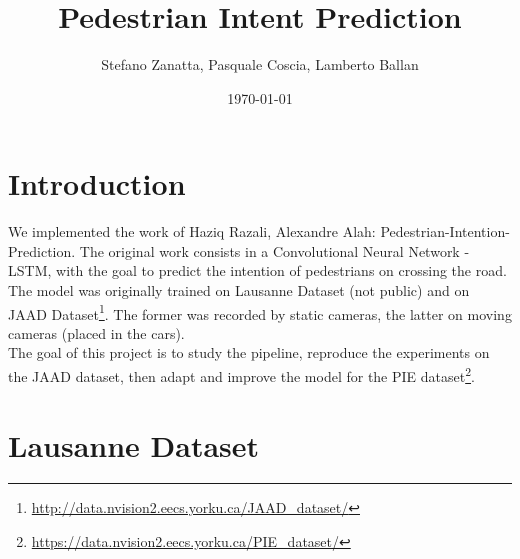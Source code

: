 \documentclass[11pt]{article}
\title{Pedestrian Intent Prediction}
\author{Stefano Zanatta, Pasquale Coscia, Lamberto Ballan}
\date{\today}
\begin{document}
\maketitle


\section{Introduction}
    We implemented the work of Haziq Razali, Alexandre Alah:
    Pedestrian-Intention-Prediction\cite{PedestrianIntentionPrediction}.
    The original work consists in a Convolutional Neural Network - LSTM, with the goal to predict the intention
    of pedestrians on crossing the road.\\
    The model was originally trained on Lausanne Dataset (not public) and on JAAD Dataset\footnote{\url{http://data.nvision2.eecs.yorku.ca/JAAD_dataset/}}.
    The former was recorded by static cameras, the latter on moving cameras (placed in the cars).\\
    The goal of this project is to study the pipeline, reproduce the experiments on the JAAD dataset, then adapt and
    improve the model for the PIE dataset\footnote{\url{https://data.nvision2.eecs.yorku.ca/PIE_dataset/}}.

\section{Lausanne Dataset}
\end{document}
